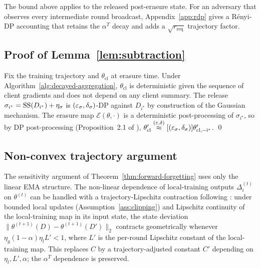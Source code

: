 \begin{remark}
The bound above applies to the released post-erasure state. For an adversary that
observes every intermediate round broadcast, Appendix~\ref{app:rdp} gives a
R\'enyi-DP accounting that retains the $\alpha^T$ decay and adds a $\sqrt{r_\mathrm{req}}$
trajectory factor.
\end{remark}

\subsection{Proof of Lemma~\ref{lem:subtraction}}
\label{app:proof-lem-sub}

Fix the training trajectory and $\theta_\mathrm{cl}$ at erasure time. Under
Algorithm~\ref{alg:decayed-aggregation}, $\theta_\mathrm{cl}$ is deterministic
given the sequence of client gradients and does not depend on any client summary.
The release $\sigma_{i^\star} = \mathrm{SS}(D_{i^\star}) + \eta_\sigma$ is
$(\varepsilon_\sigma, \delta_\sigma)$-DP against $D_{i^\star}$ by construction
of the Gaussian mechanism. The erasure map $\mathcal{E}(\theta, \cdot)$ is a
deterministic post-processing of $\sigma_{i^\star}$, so by DP post-processing
(Proposition~2.1 of \cite{dwork2014book}),
$\theta'_\mathrm{cl} \stackrel{(\varepsilon,\delta)}{\approx}[(\varepsilon_\sigma, \delta_\sigma)]
\theta'_\mathrm{cl, -i^\star}$. \qed

\subsection{Non-convex trajectory argument}
\label{app:nonconvex}

The sensitivity argument of Theorem~\ref{thm:forward-forgetting} uses only the
linear EMA structure. The non-linear dependence of local-training outputs
$\Delta_i^{(t)}$ on $\theta^{(t)}$ can be handled with a trajectory-Lipschitz
contraction following \cite{gupta2021adaptive}: under bounded local updates
(Assumption~\ref{ass:clipping}) and Lipschitz continuity of the local-training map
in its input state, the state deviation $\|\theta^{(t+1)}(D) - \theta^{(t+1)}(D')\|_2$
contracts geometrically whenever $\eta_g (1-\alpha) \eta_l L' < 1$, where $L'$ is
the per-round Lipschitz constant of the local-training map. This replaces $C$ by a
trajectory-adjusted constant $C'$ depending on $\eta_l, L', \alpha$; the $\alpha^T$
dependence is preserved.

